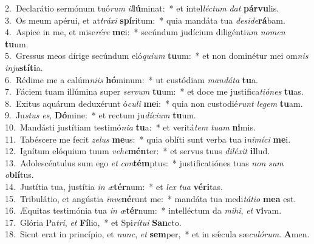 {2.~}Declarátio sermónum tuó\textit{rum} \textit{il}\textbf{lú}minat:~* et intel\textit{lé}\textit{ctum} \textit{dat} \textbf{pár}\textbf{vu}lis.\\
{3.~}Os meum apérui, et at\textit{trá}\textit{xi} \textbf{spí}ritum:~* quia mandáta tua \textit{de}\textit{si}\textit{de}\textbf{rá}bam.\\
{4.~}Aspice in me, et mise\textit{ré}\textit{re} \textbf{me}i:~* secúndum judícium diligénti\textit{um} \textit{no}\textit{men} \textbf{tu}um.\\
{5.~}Gressus meos dírige secúndum eló\textit{qui}\textit{um} \textbf{tu}um:~* et non dominétur mei om\textit{nis} \textit{in}\textit{ju}\textbf{stí}\textbf{ti}a.\\
{6.~}Rédime me a calúm\textit{ni}\textit{is} \textbf{hó}minum:~* ut custódiam \textit{man}\textit{dá}\textit{ta} \textbf{tu}a.\\
{7.~}Fáciem tuam illúmina super \textit{ser}\textit{vum} \textbf{tu}um:~* et doce me justifica\textit{ti}\textit{ó}\textit{nes} \textbf{tu}as.\\
{8.~}Exitus aquárum deduxérunt ó\textit{cu}\textit{li} \textbf{me}i:~* quia non custodié\textit{runt} \textit{le}\textit{gem} \textbf{tu}am.\\
{9.~}Ju\textit{stus} \textit{es}, \textbf{Dó}mine:~* et rectum ju\textit{dí}\textit{ci}\textit{um} \textbf{tu}um.\\
{10.~}Mandásti justítiam testimó\textit{ni}\textit{a} \textbf{tu}a:~* et veritá\textit{tem} \textit{tu}\textit{am} \textbf{ni}mis.\\
{11.~}Tabéscere me fecit \textit{ze}\textit{lus} \textbf{me}us:~* quia oblíti sunt verba tua i\textit{ni}\textit{mí}\textit{ci} \textbf{me}i.\\
{12.~}Ignítum elóquium tuum \textit{ve}\textit{he}\textbf{mén}ter:~* et servus tuus \textit{di}\textit{lé}\textit{xit} \textbf{il}lud.\\
{13.~}Adolescéntulus sum ego \textit{et} \textit{con}\textbf{tém}ptus:~* justificatiónes tuas \textit{non} \textit{sum} \textit{o}\textbf{blí}tus.\\
{14.~}Justítia tua, justítia \textit{in} \textit{æ}\textbf{tér}num:~* et \textit{lex} \textit{tu}\textit{a} \textbf{vé}\textbf{ri}tas.\\
{15.~}Tribulátio, et angústia \textit{in}\textit{ve}\textbf{né}runt me:~* mandáta tua medi\textit{tá}\textit{ti}\textit{o} \textbf{me}\textbf{a} est.\\
{16.~}Æquitas testimónia tua \textit{in} \textit{æ}\textbf{tér}num:~* intelléctum da \textit{mi}\textit{hi}, \textit{et} \textbf{vi}vam.\\
{17.~}Glória Pa\textit{tri}, \textit{et} \textbf{Fí}lio,~* et Spi\textit{rí}\textit{tu}\textit{i} \textbf{San}cto.\\
{18.~}Sicut erat in princípio, et \textit{nunc}, \textit{et} \textbf{sem}per,~* et in sǽcula sæ\textit{cu}\textit{ló}\textit{rum}. \textbf{A}men.\\
